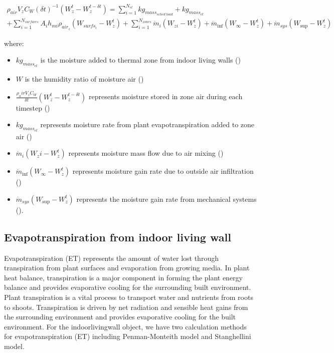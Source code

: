 \begin{equation}
\begin{array}{l}{\rho_{air}}{V_z}{C_W}{\left( {\delta t} \right)^{ - 1}}\left( {W_z^t - W_z^{t - \delta t}} \right) = \sum\limits_{i = 1}^{{N_{sl}}} {k{g_{mas{s_{sched\;load}}}}} + kg_{mass_{et}} \\ + \sum\limits_{i = 1}^{{N_{surfaces}}} {{A_i}{h_{mi}}} {\rho_{ai{r_z}}}\left( {{W_{surf{s_i}}} - W_z^t} \right)+ \sum\limits_{i = 1}^{{N_{zones}}} {{{\dot m}_i}} \left( {{W_{zi}} - W_z^t} \right) + {{\dot m}_{\inf }}\left( {{W_\infty } - W_z^t} \right) + {{\dot m}_{sys}}\left( {{W_{\sup }} - W_z^t} \right)\end{array}
\end{equation}

where:

\begin{itemize}
\tightlist
\item
  \(kg_{mass_{et}}\) is the moisture added to thermal zone from indoor living walls (\si{\massFlowRate})
\item
  \(W\) is the humidity ratio of moisture air (\si{\humidityRatio})
\item
  $\frac{\rho_air V_z C_W}{\delta t} \left(W_z^t - W_z^{t-\delta t}\right)$ represents moisture stored in zone air during each timestep (\si{\massFlowRate})
\item
  \(kg_{mass_{et}}\) represents moisture rate from plant evapotranspiration added to zone air (\si{\massFlowRate})
\item
  \({{{\dot m}_i}} \left( {W_zi - W_z^t} \right)\) represents moisture mass flow due to air mixing (\si{\massFlowRate})
\item
  \({{\dot m}_{\inf }}\left( {{W_\infty } - W_z^t} \right)\) represents moisture gain rate due to outside air infiltration (\si{\massFlowRate})
\item
  \({{\dot m}_{sys}}\left( {{W_{\sup }} - W_z^t} \right)\) represents the moisture gain rate from mechanical systems (\si{\massFlowRate}).
\end{itemize}

\subsection{Evapotranspiration from indoor living wall}\label{evaporation-from-indoor-living-wall}

Evapotranspiration (ET) represents the amount of water lost through transpiration from plant surfaces and evaporation from growing media. In plant heat balance, transpiration is a major component in forming the plant energy balance and provides evaporative cooling for the surrounding built environment. Plant transpiration is a vital process to transport water and nutrients from roots to shoots. Transpiration is driven by net radiation and sensible heat gains from the surrounding environment and provides evaporative cooling for the built environment. For the indoorlivingwall object, we have two calculation methods for evapotranspiration (ET) including Penman-Monteith model and Stanghellini model.

